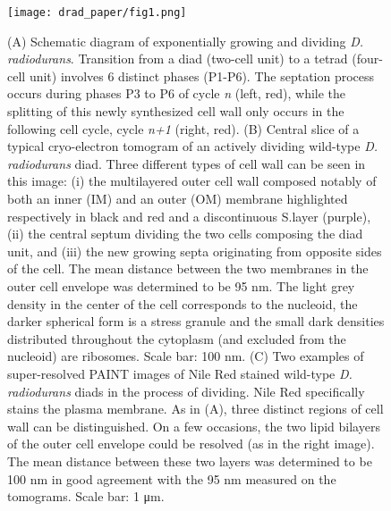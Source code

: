 \begin{figure}
    \centering
    \texttt{[image: drad\_paper/fig1.png]}
    \label{drad_fig1}
\end{figure}
\begin{figure}
    \ContinuedFloat
    \caption[]{(A) Schematic diagram of exponentially growing and dividing \textit{D. radiodurans}. Transition from a diad (two-cell unit) to a tetrad (four-cell unit) involves 6 distinct phases (P1-P6). The septation process occurs during phases P3 to P6 of cycle \textit{n} (left, red), while the splitting of this newly synthesized cell wall only occurs in the following cell cycle, cycle \textit{n+1} (right, red). (B) Central slice of a typical cryo-electron tomogram of an actively dividing wild-type \textit{D. radiodurans} diad. Three different types of cell wall can be seen in this image: (i) the multilayered outer cell wall composed notably of both an inner (IM) and an outer (OM) membrane highlighted respectively in black and red and a discontinuous S.layer (purple), (ii) the central septum dividing the two cells composing the diad unit, and (iii) the new growing septa originating from opposite sides of the cell. The mean distance between the two membranes in the outer cell envelope was determined to be 95 nm. The light grey density in the center of the cell corresponds to the nucleoid, the darker spherical form is a stress granule and the small dark densities distributed throughout the cytoplasm (and excluded from the nucleoid) are ribosomes. Scale bar: 100 nm. (C) Two examples of super-resolved PAINT images of Nile Red stained wild-type \textit{D. radiodurans} diads in the process of dividing. Nile Red specifically stains the plasma membrane. As in (A), three distinct regions of cell wall can be distinguished. On a few occasions, the two lipid bilayers of the outer cell envelope could be resolved (as in the right image). The mean distance between these two layers was determined to be 100 nm in good agreement with the 95 nm measured on the tomograms. Scale bar: 1 μm.}
\end{figure}

